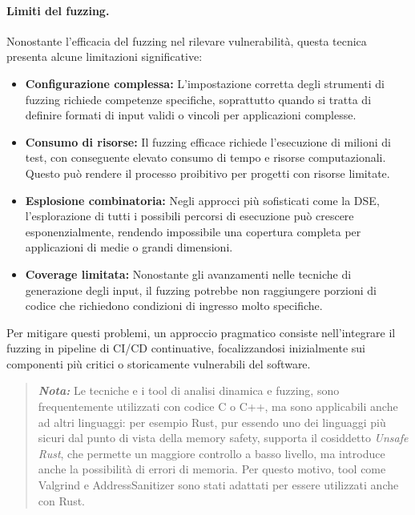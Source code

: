 \paragraph{Limiti del fuzzing.}
Nonostante l'efficacia del fuzzing nel rilevare vulnerabilità, questa tecnica
presenta alcune limitazioni significative:

\begin{itemize}
  \item \textbf{Configurazione complessa:} L'impostazione corretta degli
    strumenti di fuzzing richiede competenze specifiche, soprattutto quando si tratta
    di definire formati di input validi o vincoli per applicazioni complesse.

  \item \textbf{Consumo di risorse:} Il fuzzing efficace richiede l'esecuzione
    di milioni di test, con conseguente elevato consumo di tempo e risorse computazionali.
    Questo può rendere il processo proibitivo per progetti con risorse limitate.

  \item \textbf{Esplosione combinatoria:} Negli approcci più sofisticati come la
    DSE, l'esplorazione di tutti i possibili percorsi di esecuzione può crescere
    esponenzialmente, rendendo impossibile una copertura completa per
    applicazioni di medie o grandi dimensioni.

  \item \textbf{Coverage limitata:} Nonostante gli avanzamenti nelle tecniche di
    generazione degli input, il fuzzing potrebbe non raggiungere porzioni di codice
    che richiedono condizioni di ingresso molto specifiche.
\end{itemize}

Per mitigare questi problemi, un approccio pragmatico consiste nell'integrare il
fuzzing in pipeline di CI/CD continuative, focalizzandosi inizialmente sui componenti
più critici o storicamente vulnerabili del software.

\noindent

\begin{quote}
  \textbf{\textit{Nota:}} Le tecniche e i tool di analisi dinamica e fuzzing, sono
  frequentemente utilizzati con codice C o C++, ma sono applicabili anche ad
  altri linguaggi: per esempio Rust, pur essendo uno dei linguaggi più sicuri
  dal punto di vista della memory safety, supporta il cosiddetto \textit{Unsafe
  Rust}\footnotemark, che permette un maggiore controllo a basso livello, ma introduce
  anche la possibilità di errori di memoria. Per questo motivo, tool come Valgrind
  e AddressSanitizer sono stati adattati per essere utilizzati anche con Rust.\cite{valgrind_rust}\cite{rust_manual_san}
\end{quote}

